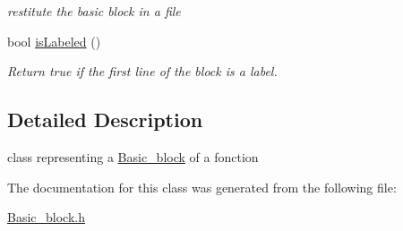 \begin{DoxyCompactItemize}
\begin{DoxyCompactList}\small\item\em restitute the basic block in a file \item\end{DoxyCompactList}\item 
\hypertarget{classBasic__block_a2b20fe8a1140b0625492d84f60f3f885}{
bool \hyperlink{classBasic__block_a2b20fe8a1140b0625492d84f60f3f885}{isLabeled} ()}
\label{classBasic__block_a2b20fe8a1140b0625492d84f60f3f885}

\begin{DoxyCompactList}\small\item\em Return true if the first line of the block is a label. \item\end{DoxyCompactList}\end{DoxyCompactItemize}


\subsection{Detailed Description}
class representing a \hyperlink{classBasic__block}{Basic\_\-block} of a fonction 

The documentation for this class was generated from the following file:\begin{DoxyCompactItemize}
\item 
\hyperlink{Basic__block_8h}{Basic\_\-block.h}\end{DoxyCompactItemize}
